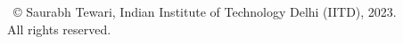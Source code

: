 \begin{center}

\large

\ \\ \
\vspace{16cm}
\ \\ \
\copyright{ Saurabh Tewari, Indian Institute of Technology Delhi (IITD), 2023.}
\\ All rights reserved.

\end{center}

